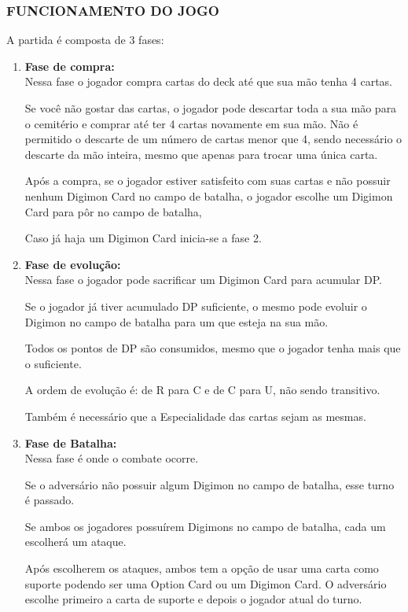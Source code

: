 \documentclass[12pt,a4paper,brazil,abntex2]{article}
\begin{document}
		\subsubsection{\normalsize FUNCIONAMENTO DO JOGO}
			A partida é composta de 3 fases:
			\begin{enumerate}
				\item {\bf Fase de compra:}\\
					Nessa fase o jogador compra cartas do deck até que sua mão tenha 4 cartas.
					
					Se você não gostar das cartas, o jogador pode descartar toda a sua mão para o cemitério e comprar até ter 4 cartas novamente em sua mão. Não é permitido o descarte de um número de cartas menor que 4, sendo necessário o descarte da mão inteira, mesmo que apenas para trocar uma única carta. 

					Após a compra, se o jogador estiver satisfeito com suas cartas e não possuir nenhum Digimon Card no campo de batalha, o jogador escolhe um Digimon Card para pôr no campo de batalha, 
					
					Caso já haja um Digimon Card inicia-se a fase 2.
				
				\item {\bf Fase de evolução:}\\
					Nessa fase o jogador pode sacrificar um Digimon Card para acumular DP.
					
					Se o jogador já tiver acumulado DP suficiente, o mesmo pode evoluir o Digimon no campo de batalha para um que esteja na sua mão.
					
					Todos os pontos de DP  são consumidos, mesmo que o jogador tenha mais que o suficiente.

					A ordem de evolução é: de R para C e de C para U, não sendo transitivo. 
					
					Também é necessário que a Especialidade das cartas sejam as mesmas.
					
				\item {\bf Fase de Batalha:}\\
					Nessa fase é onde o combate ocorre. 
					
					Se o adversário não possuir algum Digimon no campo de batalha, esse turno é passado. 
					
					Se ambos os jogadores possuírem Digimons no campo de batalha, cada um escolherá um ataque.
					
					Após escolherem os ataques, ambos tem a opção de usar uma carta como suporte podendo ser uma Option Card ou um Digimon Card. O adversário escolhe primeiro a carta de suporte e depois o jogador atual do turno.
					

\end{enumerate}
\end{document}
